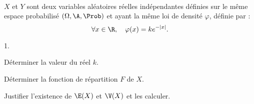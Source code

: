 \documentclass[11pt]{article}%
\begin{document}
\begin{exerciceSP}~\\
  $X$ et $Y$ sont deux variables aléatoires réelles indépendantes
  définies sur le même espace probabilisé $(\Omega , \A ,
  \Prob)$ et ayant la même loi de densité $\varphi$, définie par :
  \[
  \forall x \in \R,\ \ \ \varphi(x) = k e^{ - \vert x \vert}.
  \]
  \begin{noliste}{1.}
    \setlength{\itemsep}{2mm}
  \item Déterminer la valeur du réel $k$.
  \item Déterminer la fonction de répartition $F$ de $X$.
  \item Justifier l'existence de $\E(X)$ et $\V(X)$ et les calculer.
  \end{noliste}
\end{exerciceSP}


\end{document}
